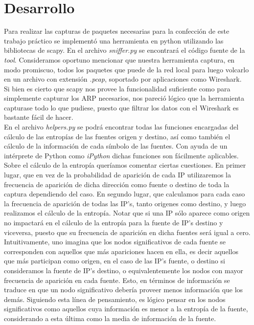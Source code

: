 \section{Desarrollo}

\indent \indent Para realizar las capturas de paquetes necesarias para la confección de este trabajo práctico se implementó una herramienta en python utilizando las bibliotecas de scapy. En el archivo \textit{sniffer.py} se encontrará el código fuente de la \textit{tool}. Consideramos oportuno mencionar que nuestra herramienta captura, en modo promiscuo, todos los paquetes que puede de la red local para luego volcarlo en un archivo con extensión \textit{.pcap}, soportado por aplicaciones como Wireshark.\\
\indent Si bien es cierto que scapy nos provee la funcionalidad suficiente como para simplemente capturar los ARP necesarios, nos pareció lógico que la herramienta capturase todo lo que pudiese, puesto que filtrar los datos con el Wireshark es bastante fácil de hacer.\\
\indent En el archivo \textit{helpers.py} se podrá encontrar todas las funciones encargadas del cálculo de las entropías de las fuentes origen y destino, así como también el cálculo de la información de cada símbolo de las fuentes. Con ayuda de un intérprete de Python como \textit{iPython} dichas funciones son fácilmente aplicables.\\
\indent Sobre el cálculo de la entropía queríamos comentar ciertas cuestiones. En primer lugar, que en vez de la probabilidad de aparición de cada IP utilizaremos la frecuencia de aparición de dicha dirección como fuente o destino de toda la captura dependiendo del caso. En segundo lugar, que calculamos para cada caso la frecuencia de aparición de todas las IP's, tanto origenes como destino, y luego realizamos el cálculo de la entropía. Notar que si una IP sólo aparece como origen no impactará en el cálculo de la entropía para la fuente de IP's destino y viceversa, puesto que su frecuencia de aparición en dicha fuentes será igual a cero.\\
\indent Intuitivamente, uno imagina que los nodos significativos de cada fuente se corresponden con aquellos que más apariciones hacen en ella, es decir aquellos que más participan como origen, en el caso de las IP's fuente, o destino si consideramos la fuente de IP's destino, o equivalentemente los nodos con mayor frecuencia de aparición en cada fuente. Esto, en términos de información se traduce en que un nodo significativo debería proveer menos información que los demás. Siguiendo esta línea de pensamiento, es lógico pensar en los nodos significativos como aquellos cuya información es menor a la entropía de la fuente, considerando a esta última como la media de información de la fuente.\\

